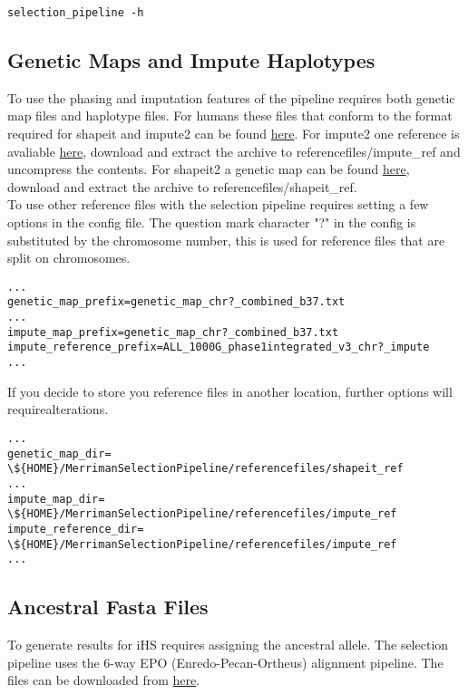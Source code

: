 \documentclass[a4paper,10pt]{article}
\begin{document}
\begin{verbatim}
selection_pipeline -h
\end{verbatim}

\subsection{Genetic Maps and Impute Haplotypes}
To use the phasing and imputation features of the pipeline requires both genetic map files and haplotype files. For humans these files that conform to the format required for shapeit and impute2 can be found \href{http://mathgen.stats.ox.ac.uk/impute/impute_v2.html#reference}{here}. For impute2 one reference is avaliable \href{http://mathgen.stats.ox.ac.uk/impute/ALL_1000G_phase1integrated_v3_impute_macGT1.tgz}{here}, download and extract the archive to referencefiles/impute\_ref and uncompress the contents. For shapeit2 a genetic map can be found \href{http://www.shapeit.fr/files/genetic_map_b37.tar.gz}{here}, download and extract the archive to referencefiles/shapeit\_ref.\\

To use other reference files with the selection pipeline requires setting a few options in the config file. The question mark character "?" in the config is substituted by the chromosome number, this is used for reference files that are split on chromosomes.\\
\begin{verbatim}
...
genetic_map_prefix=genetic_map_chr?_combined_b37.txt
...
impute_map_prefix=genetic_map_chr?_combined_b37.txt
impute_reference_prefix=ALL_1000G_phase1integrated_v3_chr?_impute
...
\end{verbatim}

If you decide to store you reference files in another location, further options will requirealterations.\\ 
\begin{verbatim}
...
genetic_map_dir= \${HOME}/MerrimanSelectionPipeline/referencefiles/shapeit_ref
...
impute_map_dir= \${HOME}/MerrimanSelectionPipeline/referencefiles/impute_ref
impute_reference_dir= \${HOME}/MerrimanSelectionPipeline/referencefiles/impute_ref
...
\end{verbatim}

\subsection{Ancestral Fasta Files}
To generate results for iHS requires assigning the ancestral allele. The selection pipeline uses the 6-way EPO (Enredo-Pecan-Ortheus) alignment pipeline. The files can be downloaded from \href{ftp://ftp.1000genomes.ebi.ac.uk/vol1/ftp/phase1/analysis_results/supporting/ancestral_alignments/human_ancestor_GRCh37_e59.tar.bz2}{here}.
\end{document}
